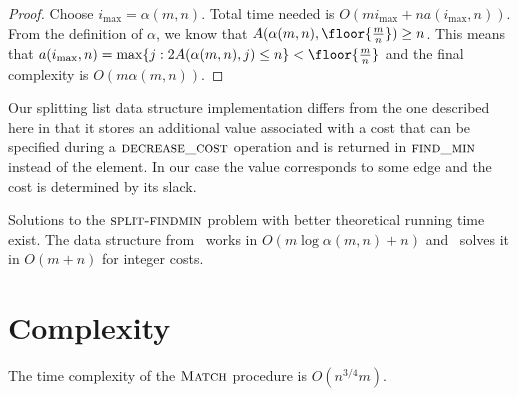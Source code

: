 \begin{proof}
    Choose $i_{\max} = \alpha(m,n)$. Total time needed is $O(mi_{\max} + na(i_{\max},n))$. From the definition of $\alpha$, we know that $A(\alpha(m,n), \floor{\frac{m}{n}}) \geq n$. This means that $a(i_{\max},n) = \max \{ j: 2A(\alpha(m,n), j) \leq n \} < \floor{\frac{m}{n}}$ and the final complexity is $O(m\alpha(m,n))$.
\end{proof}

Our splitting list data structure implementation differs from the one described here in that it stores an additional value associated with a cost that can be specified during a $\textsc{decrease\_cost}$ operation and is returned in $\textsc{find\_min}$ instead of the element. In our case the value corresponds to some edge and the cost is determined by its slack.


Solutions to the $\textsc{split-findmin}$ problem with better theoretical running time exist. The data structure from~\cite{pettie2005sensitivity} works in $O(m \log \alpha(m, n) + n)$ and~\cite{thorup2007equivalence} solves it in $O(m + n)$ for integer costs.

\section{Complexity}

\begin{theorem}
    The time complexity of the $\textsc{Match}$ procedure is $O(n^{3/4}m)$.
\end{theorem}

